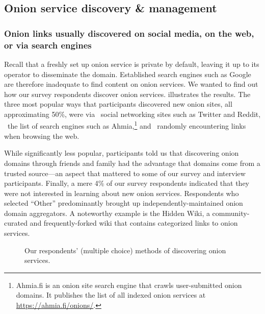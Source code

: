 \subsection{Onion service discovery \& management}
\label{sec:manage}

\subsubsection{Onion links usually discovered on social media, on the web, or via search engines }
Recall that a freshly set up onion service is private by default, leaving it up
to its operator to disseminate the domain.  Established search engines such as
Google are therefore inadequate to find content on onion services.  We wanted to
find out how our survey respondents discover onion services.
 illustrates the results.  The three most popular ways
that participants discovered new onion sites, all approximating 50\%, were via \first~social
networking sites such as Twitter and Reddit, \second~the list of search engines
such as Ahmia,\footnote{Ahmia.fi is an onion site search engine that crawls
user-submitted onion domains.  It publishes the list of all indexed onion
services at \url{https://ahmia.fi/onions/}.} and \third~randomly encountering
links when browsing the web.

While significantly less popular, participants told us that discovering onion domains through friends and
family had the advantage that domains come from a trusted source---an aspect
that mattered to some of our survey and interview participants.  Finally, a mere
4\% of our survey respondents indicated that they were not interested in learning about new onion services.
Respondents who selected ``Other'' predominantly brought up
independently-maintained onion domain aggregators.  A noteworthy example is the
Hidden Wiki, a community-curated and frequently-forked wiki that contains
categorized links to onion services.

\begin{figure}[t]
    \centering
    
    \caption{Our respondents' (multiple choice) methods of discovering onion
    services.}
    \label{fig:onion-discovery}
\end{figure}


